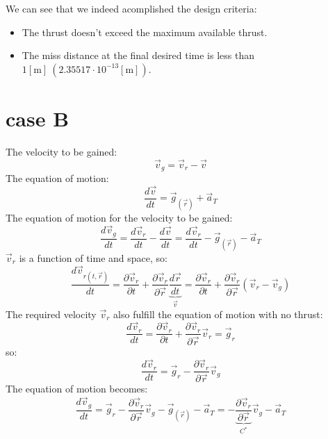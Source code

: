 \documentclass[11pt, a4paper]{article}
\begin{document}
We can see that we indeed acomplished the design criteria:
\begin{itemize}
    \item The thrust doesn't exceed the maximum available thrust.
    \item The miss distance at the final desired time is less than $1[\mathrm{m}]\ \left(2.35517\cdot10^{-13}\left[\mathrm{m}\right]\right)$.
\end{itemize}

\newpage
\section{case B}
The velocity to be gained:
\begin{equation}
    \vec{v}_g=\vec{v}_r-\vec{v}
\end{equation}
The equation of motion:
\begin{equation}
    \frac{d\vec{v}}{dt} = \vec{g}_{\left(\vec{r}\right)}+\vec{a}_T
\end{equation}
The equation of motion for the velocity to be gained:
\begin{equation}
    \frac{d\vec{v}_g}{dt} = \frac{d\vec{v}_r}{dt} - \frac{d\vec{v}}{dt} = \frac{d\vec{v}_r}{dt} - \vec{g}_{\left(\vec{r}\right)} - \vec{a}_T
\end{equation}
$\vec{v}_r$ is a function of time and space, so:
\begin{equation*}
    \frac{d\vec{v}_{r(t,\vec{r})}}{dt} = \frac{\partial\vec{v}_r}{\partial t} + \frac{\partial \vec{v}_r}{\partial\vec{r}}\underbrace{\frac{d\vec{r}}{dt}}_{\vec{v}} = \frac{\partial\vec{v}_r}{\partial t} + \frac{\partial \vec{v}_r}{\partial\vec{r}}\left(\vec{v}_r-\vec{v}_g\right)
\end{equation*}
The required velocity $\vec{v}_r$ also fulfill the equation of motion with no thrust:
\begin{equation*}
    \frac{d\vec{v}_r}{dt} = \frac{\partial\vec{v}_r}{\partial t} + \frac{\partial\vec{v}_r}{\partial \vec{r}}\vec{v}_r = \vec{g}_r
\end{equation*}
so:
\begin{equation}
    \frac{d\vec{v}_r}{dt} = \vec{g}_r - \frac{\partial\vec{v}_r}{\partial\vec{r}}\vec{v}_g
\end{equation}
The equation of motion becomes:
\begin{equation}
    \frac{d\vec{v}_g}{dt} =  \vec{g}_r - \frac{\partial\vec{v}_r}{\partial\vec{r}}\vec{v}_g -\vec{g}_{(\vec{r})} -\vec{a}_T = -\underbrace{\frac{\partial\vec{v}_r}{\partial\vec{r}}}_{C^*}\vec{v}_g-\vec{a}_T
\end{equation}
\end{document}

